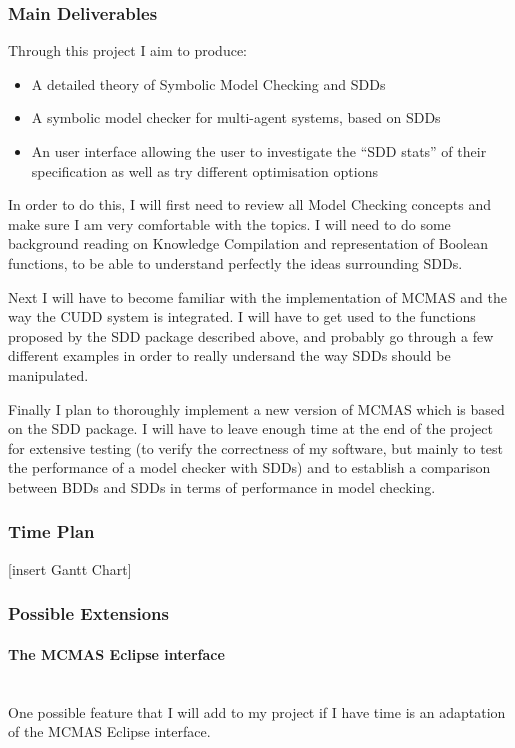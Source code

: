 \documentclass{article}
\newcommand{\myparagraph}[1]{\paragraph{#1}\mbox{}\\}
\begin{document}
\subsubsection{Main Deliverables}

Through this project I aim to produce:
\begin{itemize}
\item A detailed theory of Symbolic Model Checking and SDDs
\item A symbolic model checker for multi-agent systems, based on SDDs
\item An user interface allowing the user to investigate the ``SDD stats'' of their specification as well as try different optimisation options
\end{itemize}

In order to do this, I will first need to review all Model Checking concepts and make sure I am very comfortable with the topics. I will need to do some background reading on Knowledge Compilation and representation of Boolean functions, to be able to understand perfectly the ideas surrounding SDDs.

Next I will have to become familiar with the implementation of MCMAS and the way the CUDD system is integrated. I will have to get used to the functions proposed by the SDD package described above, and probably go through a few different examples in order to really undersand the way SDDs should be manipulated.

Finally I plan to thoroughly implement a new version of MCMAS which is based on the SDD package.
I will have to leave enough time at the end of the project for extensive testing (to verify the correctness of my software, but mainly to test the performance of a model checker with SDDs) and to establish a comparison between BDDs and SDDs in terms of performance in model checking. 

\subsubsection{Time Plan}

[insert Gantt Chart]

\subsubsection{Possible Extensions}

\myparagraph{The MCMAS Eclipse interface}

One possible feature that I will add to my project if I have time is an adaptation of the MCMAS Eclipse interface.
\end{document}
